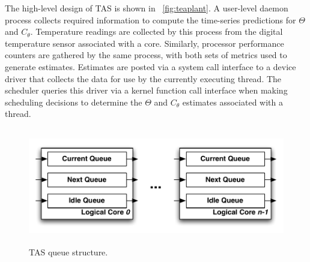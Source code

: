 \documentclass[times, 10pt,twocolumn]{IEEEtran}
\begin{document}
The high-level design of TAS is shown in \figurename~\ref{fig:teaplant}.
A user-level daemon process collects required information to compute
the time-series predictions for $\Theta$ and $C_{\theta}$. Temperature
readings are collected by this process from the digital temperature
sensor associated with a core.  Similarly, processor performance
counters are gathered by the same process, with both sets of metrics
used to generate estimates. Estimates are posted via a system call
interface to a device driver that collects the data for use by
the currently executing thread.  The scheduler queries this
driver via a kernel function call interface when making scheduling
decisions to determine the $\Theta$ and $C_{\theta}$ estimates
associated with a thread.

\begin{figure}[t]
  \centering
  \includegraphics[height=2in,width=1.0\linewidth]{th_que}
  \caption{TAS queue structure.}
  \label{fig:tasque}
\end{figure}
\end{document}
